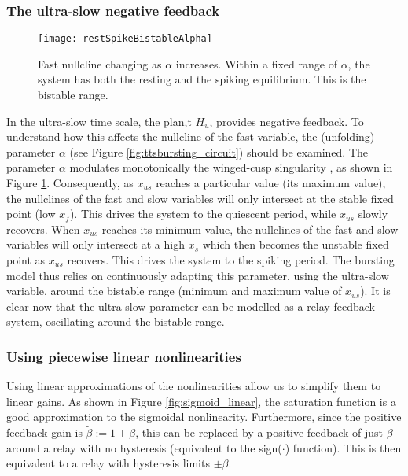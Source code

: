\documentclass[a4paper, 12pt]{article}
\begin{document}
\subsubsection{The ultra-slow negative feedback}
\begin{figure}[h!]
\texttt{[image: restSpikeBistableAlpha]}
\caption{Fast nullcline changing as $\alpha$ increases. Within a fixed range of $\alpha$, the system has both the resting and the spiking equilibrium. This is the bistable range.}
\label{fig:alphaParameter}
\end{figure}
In the ultra-slow time scale, the plan,t $H_{u}$, provides negative feedback. To understand how this affects the nullcline of the fast variable, the (unfolding) parameter $\alpha$ (see Figure \ref{fig:ttsbursting_circuit}) should be examined. The parameter $\alpha$ modulates monotonically the winged-cusp singularity \cite{franci}, as shown in Figure \ref{fig:alphaParameter}. Consequently, as $x_{us}$ reaches a particular value (its maximum value), the nullclines of the fast and slow variables will only intersect at the stable fixed point (low $x_f$). This drives the system to the quiescent period, while $x_{us}$ slowly recovers. When $x_{us}$ reaches its minimum value, the nullclines of the fast and slow variables will only intersect at a high $x_{s}$ which then becomes the unstable fixed point as $x_{us}$ recovers. This drives the system to the spiking period. The bursting model thus relies on continuously adapting this parameter, using the ultra-slow variable, around the bistable range (minimum and maximum value of $x_{us}$). 
It is clear now that the ultra-slow parameter can be modelled as a relay feedback system, oscillating around the bistable range. 


\subsubsection{Using piecewise linear nonlinearities}
Using linear approximations of the nonlinearities allow us to simplify them to linear gains. As shown in Figure \ref{fig:sigmoid_linear}, the saturation function is a good approximation to the sigmoidal nonlinearity. Furthermore, since the positive feedback gain is $\tilde{\beta}:=1 + \beta$, this can be replaced by a positive feedback of just $\beta$ around a relay with no hysteresis (equivalent to the sign($\cdot$) function). This is then equivalent to a relay with hysteresis limits $\pm \beta$. 
\end{document}

